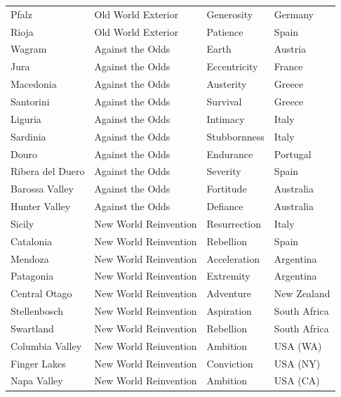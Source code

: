 \documentclass[11pt]{article}
\begin{document}
\begin{small}
\begin{longtable}{p{4.5cm} p{4cm} p{3cm} p{3cm}}
Pfalz                    & Old World Exterior      & Generosity     & Germany \\
Rioja                    & Old World Exterior      & Patience       & Spain \\
\midrule
Wagram                   & Against the Odds        & Earth          & Austria \\
Jura                     & Against the Odds        & Eccentricity   & France \\
Macedonia                & Against the Odds        & Austerity      & Greece \\
Santorini                & Against the Odds        & Survival       & Greece \\
Liguria                  & Against the Odds        & Intimacy       & Italy \\
Sardinia                 & Against the Odds        & Stubbornness   & Italy \\
Douro                    & Against the Odds        & Endurance      & Portugal \\
Ribera del Duero         & Against the Odds        & Severity       & Spain \\
Barossa Valley           & Against the Odds        & Fortitude      & Australia \\
Hunter Valley            & Against the Odds        & Defiance       & Australia \\
\midrule
Sicily                   & New World Reinvention   & Resurrection   & Italy \\
Catalonia                & New World Reinvention   & Rebellion      & Spain \\
Mendoza                  & New World Reinvention   & Acceleration   & Argentina \\
Patagonia                & New World Reinvention   & Extremity      & Argentina \\
Central Otago            & New World Reinvention   & Adventure      & New Zealand \\
Stellenbosch             & New World Reinvention   & Aspiration     & South Africa \\
Swartland                & New World Reinvention   & Rebellion      & South Africa \\
Columbia Valley          & New World Reinvention   & Ambition       & USA (WA) \\
Finger Lakes             & New World Reinvention   & Conviction     & USA (NY) \\
Napa Valley              & New World Reinvention   & Ambition       & USA (CA) \\

\end{longtable}
\end{small}
\end{document}
